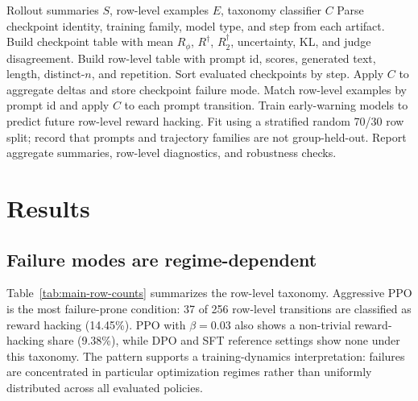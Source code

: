 \documentclass[11pt]{article}
\newcommand{\Rphi}{R_{\phi}}
\newcommand{\Rdag}{R^{\dagger}}
\newcommand{\Rtwo}{R^{\dagger}_2}
\begin{document}
\begin{algorithm}[t]
\caption{Artifact-driven diagnostic pipeline}
\label{alg:pipeline}
\begin{algorithmic}[1]
\Require Rollout summaries $S$, row-level examples $E$, taxonomy classifier $C$
\State Parse checkpoint identity, training family, model type, and step from each artifact.
\State Build checkpoint table with mean $\Rphi$, $\Rdag$, $\Rtwo$, uncertainty, KL, and judge disagreement.
\State Build row-level table with prompt id, scores, generated text, length, distinct-$n$, and repetition.
    \State Sort evaluated checkpoints by step.
        \State Apply $C$ to aggregate deltas and store checkpoint failure mode.
        \State Match row-level examples by prompt id and apply $C$ to each prompt transition.
    \EndFor
\EndFor
\State Train early-warning models to predict future row-level reward hacking.
\State Fit using a stratified random 70/30 row split; record that prompts and trajectory families are not group-held-out.
\State Report aggregate summaries, row-level diagnostics, and robustness checks.
\end{algorithmic}
\end{algorithm}

\section{Results}
\subsection{Failure modes are regime-dependent}
Table~\ref{tab:main-row-counts} summarizes the row-level taxonomy. Aggressive PPO is the most failure-prone condition: 37 of 256 row-level transitions are classified as reward hacking (14.45\%). PPO with $\beta=0.03$ also shows a non-trivial reward-hacking share (9.38\%), while DPO and SFT reference settings show none under this taxonomy. The pattern supports a training-dynamics interpretation: failures are concentrated in particular optimization regimes rather than uniformly distributed across all evaluated policies.
\end{document}

